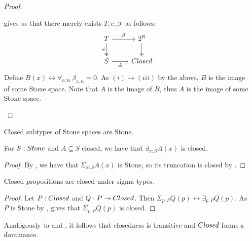 \begin{proof}
\begin{itemize}
     gives us that there merely exists $T, e, \beta_\cdot$ as follows:
     \[
       \begin{tikzcd}
         T \arrow[r,"\beta"] \arrow[d, two heads,swap,"e"] & 2^\mathbb N 
         \arrow[d,two heads] \\
         S \arrow[r,swap,"A"] & \Closed
       \end{tikzcd} 
     \] 
     Define $B(x) \leftrightarrow \forall_{n:\mathbb N}\, \beta_{x,n} = 0$. 
     As $(i) \to (iii)$ by the above, $B$ is the image of some Stone space. 
     Note that $A$ is the image of $B$, 
     thus $A$ is the image of some Stone space. 
     \end{itemize} 
     \end{proof} 

\begin{corollary}\label{ClosedInStoneIsStone}
Closed subtypes of Stone spaces are Stone.
\end{corollary}

\begin{corollary}\label{InhabitedClosedSubSpaceClosed}
  For $S:\Stone$ and $A\subseteq S$ closed, we have that 
  $\exists_{x:S} A(x)$ is closed. 
\end{corollary}
\begin{proof}
  By , we have that $\Sigma_{x:S}A(x)$ is Stone, 
  so its truncation is closed by .
\end{proof}

\begin{corollary}\label{ClosedDependentSums}
  Closed propositions are closed under sigma types. 
\end{corollary}
\begin{proof}
  Let $P:\Closed$ and $Q:P \to \Closed$. 
  Then $\Sigma_{p:P} Q(p) \leftrightarrow \exists_{p:P} Q(p)$.
  As $P$ is Stone by , 
   gives that $\Sigma_{p:P} Q(p)$ is closed. 
\end{proof}
\begin{remark}\label{ClosedDominance}\label{ClosedTransitive}
  Analogously to  and , it follows that 
  closedness is transitive and $\Closed$ forms a dominance. 
\end{remark}



